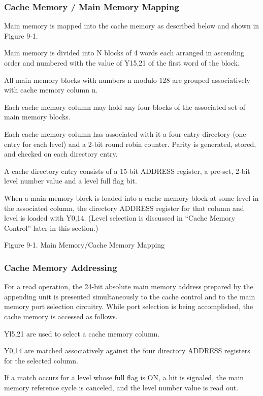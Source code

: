 \subsubsection{Cache Memory / Main Memory Mapping}

Main memory is mapped into the cache memory as described below and shown in
Figure 9-1.

Main memory is divided into N blocks of 4 words each arranged in ascending
order and numbered with the value of Y15,21 of the first word of the block.

All main memory blocks with numbers n modulo 128 are grouped associatively with
cache memory column n.

Each cache memory column may hold any four blocks of the associated set of main
memory blocks.

Each cache memory column has associated with it a four entry directory (one
entry for each level) and a 2-bit round robin counter. Parity is generated,
stored, and checked on each directory entry.

A cache directory entry consists of a 15-bit ADDRESS register, a pre-set, 2-bit
level number value and a level full flag bit.

When a main memory block is loaded into a cache memory block at some level in
the associated column, the directory ADDRESS register for that column and level
is loaded with Y0,14. (Level selection is discussed in {``}Cache Memory
Control'' later in this section.)

Figure 9-1. Main Memory/Cache Memory Mapping

\subsubsection{Cache Memory Addressing}

For a read operation, the 24-bit absolute main memory address prepared by the
appending unit is presented simultaneously to the cache control and to the main
memory port selection circuitry. While port selection is being accomplished,
the cache memory is accessed as follows.  

Yl5,21 are used to select a cache memory column.  

Y0,14 are matched associatively against the four directory ADDRESS registers
for the selected column.

If a match occurs for a level whose full flag is ON, a hit is signaled, the
main memory reference cycle is canceled, and the level number value is read
out.

